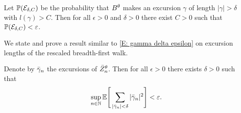 \begin{lemma} \label{L: late excursions gamma}
	Let $\mathbb{P}(\mathcal{E}_{\delta, C})$ be the probability that $B^{\theta}$ makes an excursion $\gamma$ 
	of length $|\gamma| > \delta$ with $l(\gamma) > C$.
	Then for all $\epsilon > 0$ and $\delta > 0$ there exist $C > 0$ such that $\mathbb{P}(\mathcal{E}_{\delta, C}) < \varepsilon$.
\end{lemma}	

We state and prove a result similar to \eqref{E: gamma delta epsilon} on excursion lengths of the rescaled breadth-first walk.
\begin{lemma} \label{L: sum rgamman}
	Denote by $\bar{\gamma}_n$ the excursions of $\bar{Z}^{\theta}_n$. 
	Then for all $\epsilon > 0$ there exists $\delta > 0$ such that
	\begin{equation*}
		\sup_{n \in \mathbb{N}} \mathbb{E}\Bigg[\sum_{|\bar{\gamma}_n| < \delta} |\bar{\gamma}_n|^2\Bigg] < \varepsilon.
	\end{equation*}
\end{lemma}
